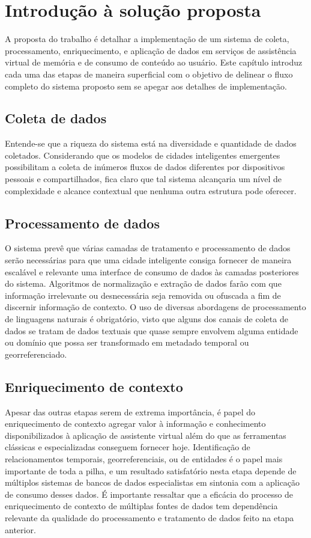 \chapter{Introdução à solução proposta}

A proposta do trabalho é detalhar a implementação de um sistema de coleta, processamento, enriquecimento, e aplicação de dados em serviços de assistência virtual de memória e de consumo de conteúdo ao usuário. Este capítulo introduz cada uma das etapas de maneira superficial com o objetivo de delinear o fluxo completo do sistema proposto sem se apegar aos detalhes de implementação.

\section{Coleta de dados}

Entende-se que a riqueza do sistema está na diversidade e quantidade de dados coletados. Considerando que os modelos de cidades inteligentes emergentes possibilitam a coleta de inúmeros fluxos de dados diferentes por dispositivos pessoais e compartilhados, fica claro que tal sistema alcançaria um nível de complexidade e alcance contextual que nenhuma outra estrutura pode oferecer. 

\section{Processamento de dados}

O sistema prevê que várias camadas de tratamento e processamento de dados serão necessárias para que uma cidade inteligente consiga fornecer de maneira escalável e relevante uma interface de consumo de dados às camadas posteriores do sistema. Algoritmos de normalização e extração de dados farão com que informação irrelevante ou desnecessária seja removida ou ofuscada a fim de discernir informação de contexto. O uso de diversas abordagens de processamento de linguagens naturais é obrigatório, visto que alguns dos canais de coleta de dados se tratam de dados textuais que quase sempre envolvem alguma entidade ou domínio que possa ser transformado em metadado temporal ou georreferenciado.

\section{Enriquecimento de contexto}

Apesar das outras etapas serem de extrema importância, é papel do enriquecimento de contexto agregar valor à informação e conhecimento disponibilizados à aplicação de assistente virtual além do que as ferramentas clássicas e especializadas conseguem fornecer hoje. Identificação de relacionamentos temporais, georreferenciais, ou de entidades é o papel mais importante de toda a pilha, e um resultado satisfatório nesta etapa depende de múltiplos sistemas de bancos de dados especialistas em sintonia com a aplicação de consumo desses dados. É importante ressaltar que a eficácia do processo de enriquecimento de contexto de múltiplas fontes de dados tem dependência relevante da qualidade do processamento e tratamento de dados feito na etapa anterior.

